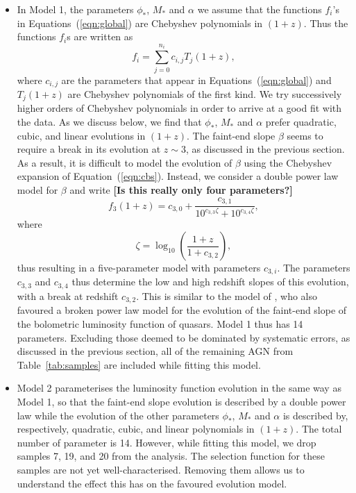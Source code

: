 \documentclass[a4paper,fleqn,usenatbib]{mnras}
\newcommand{\gk}[1]{{\bf \color{notecolor} [#1]}}
\begin{document}
\begin{itemize}

\item In Model 1, the parameters $\phi_*$, $M_*$ and $\alpha$ we
  assume that the functions $f_i$'s in Equations~(\ref{eqn:global})
  are Chebyshev polynomials in $(1+z)$.  Thus the functions $f_i$s are
  written as
  \begin{equation}
    f_i=\sum_{j=0}^{n_i}c_{i,j}T_j(1+z),
    \label{eqn:cbs}
  \end{equation}
  where $c_{i,j}$ are the parameters that appear in
  Equations~(\ref{eqn:global}) and $T_j(1+z)$ are Chebyshev
  polynomials of the first kind.  We try successively higher orders of
  Chebyshev polynomials in order to arrive at a good fit with the
  data.  As we discuss below, we find that $\phi_*$, $M_*$ and
  $\alpha$ prefer quadratic, cubic, and linear evolutions in $(1+z)$.
  The faint-end slope $\beta$ seems to require a break in its
  evolution at $z\sim 3$, as discussed in the previous section.  As a
  result, it is difficult to model the evolution of $\beta$ using the
  Chebyshev expansion of Equation~(\ref{eqn:cbs}).  Instead, we
  consider a double power law model for $\beta$ and write \gk{Is this
    really only four parameters?}
  \begin{equation}
    f_3(1+z)=c_{3,0}+\frac{c_{3,1}}{10^{c_{3,3}\zeta}+10^{c_{3,4}\zeta}},
  \end{equation}
  where
  \begin{equation}
    \zeta = \log_{10}\left(\frac{1+z}{1+c_{3,2}}\right),
  \end{equation}
  thus resulting in a five-parameter model with parameters $c_{3,i}$.
  The parameters $c_{3,3}$ and $c_{3,4}$ thus determine the low and
  high redshift slopes of this evolution, with a break at redshift
  $c_{3,2}$.  This is similar to the model of
  \citet{2007ApJ...654..731H}, who also favoured a broken power law
  model for the evolution of the faint-end slope of the bolometric
  luminosity function of quasars.  Model 1 thus has 14 parameters.
  Excluding those deemed to be dominated by systematic errors, as
  discussed in the previous section, all of the remaining AGN from
  Table~\ref{tab:samples} are included while fitting this model.

\item Model 2 parameterises the luminosity function evolution in the
  same way as Model 1, so that the faint-end slope evolution is
  described by a double power law while the evolution of the other
  parameters $\phi_*$, $M_*$ and $\alpha$ is described by,
  respectively, quadratic, cubic, and linear polynomials in $(1+z)$.
  The total number of parameter is 14.  However, while fitting this
  model, we drop samples 7, 19, and 20 from the analysis.  The
  selection function for these samples are not yet well-characterised.
  Removing them allows us to understand the effect this has on the
  favoured evolution model.


\end{itemize}
\end{document}
